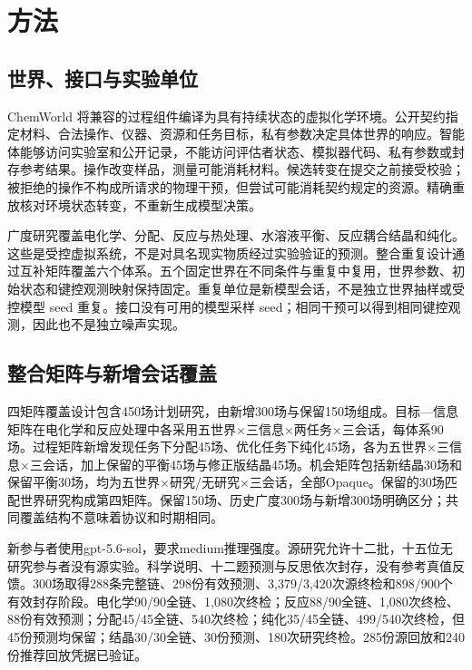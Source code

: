 \documentclass[10pt,a4paper]{article}
\begin{document}
\clearpage

\section{方法}\label{ux65b9ux6cd5}

\subsection{世界、接口与实验单位}\label{ux4e16ux754cux63a5ux53e3ux4e0eux5b9eux9a8cux5355ux4f4d}

ChemWorld 将兼容的过程组件编译为具有持续状态的虚拟化学环境。公开契约指定材料、合法操作、仪器、资源和任务目标，私有参数决定具体世界的响应。智能体能够访问实验室和公开记录，不能访问评估者状态、模拟器代码、私有参数或封存参考结果。操作改变样品，测量可能消耗材料。候选转变在提交之前接受校验；被拒绝的操作不构成所请求的物理干预，但尝试可能消耗契约规定的资源。精确重放核对环境状态转变，不重新生成模型决策。

广度研究覆盖电化学、分配、反应与热处理、水溶液平衡、反应耦合结晶和纯化。这些是受控虚拟系统，不是对具名现实物质经过实验验证的预测。整合重复设计通过互补矩阵覆盖六个体系。五个固定世界在不同条件与重复中复用，世界参数、初始状态和键控观测映射保持固定。重复单位是新模型会话，不是独立世界抽样或受控模型 seed 重复。接口没有可用的模型采样 seed；相同干预可以得到相同键控观测，因此也不是独立噪声实现。

\subsection{整合矩阵与新增会话覆盖}\label{ux6574ux5408ux77e9ux9635ux4e0eux65b0ux589eux4f1aux8bddux8986ux76d6}

四矩阵覆盖设计包含450场计划研究，由新增300场与保留150场组成。目标---信息矩阵在电化学和反应处理中各采用五世界×三信息×两任务×三会话，每体系90场。过程矩阵新增发现任务下分配45场、优化任务下纯化45场，各为五世界×三信息×三会话，加上保留的平衡45场与修正版结晶45场。机会矩阵包括新结晶30场和保留平衡30场，均为五世界×研究/无研究×三会话，全部Opaque。保留的30场匹配世界研究构成第四矩阵。保留150场、历史广度300场与新增300场明确区分；共同覆盖结构不意味着协议和时期相同。

新参与者使用gpt-5.6-sol，要求medium推理强度。源研究允许十二批，十五位无研究参与者没有源实验。科学说明、十二题预测与反思依次封存，没有参考真值反馈。300场取得288条完整链、298份有效预测、3,379/3,420次源终检和898/900个有效封存阶段。电化学90/90全链、1,080次终检；反应88/90全链、1,080次终检、88份有效预测；分配45/45全链、540次终检；纯化35/45全链、499/540次终检，但45份预测均保留；结晶30/30全链、30份预测、180次研究终检。285份源回放和240份推荐回放凭据已验证。
\end{document}
